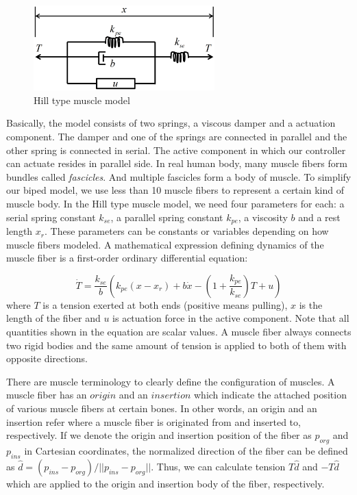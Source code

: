 \documentclass[master,english,final]{kaist-ucs}
\begin{document}
\begin{figure}[h!]
  \centering
  \includegraphics[width=2.75in]{musclemodel}
  \caption{Hill type muscle model}
\end{figure}

\noindent Basically, the model consists of two springs, a viscous damper and a actuation component.
The damper and one of the springs are connected in parallel and the other spring is
connected in serial. The active component in which our controller
can actuate resides in parallel side.
In real human body, many muscle fibers form bundles called \emph{fascicles}.
And multiple fascicles form a body of muscle.
To simplify our biped model, we use less than 10 muscle fibers to represent a certain kind of muscle body.
In the Hill type muscle model, we need four parameters for each:
a serial spring constant $k_{se}$, a parallel spring constant $k_{pe}$, a viscosity $b$ and a rest length $x_{r}$.
These parameters can be constants or variables depending on how muscle fibers modeled.
A mathematical expression defining dynamics of the muscle fiber is a first-order ordinary differential equation:

\begin{equation}\label{Tension}
\dot{T} = \frac{k_{se}}{b} \left( k_{pe}(x-x_{r})+b\dot{x}-\left(1+\frac{k_{pe}}{k_{se}}\right)T+u   \right)
\end{equation}
where $T$ is a tension exerted at both ends (positive means pulling), $x$ is the length of the fiber and $u$ is actuation force in the active component.
Note that all quantities shown in the equation are scalar values.
A muscle fiber always connects two rigid bodies and the same amount of
tension is applied to both of them with opposite directions.


There are muscle terminology to clearly define the configuration of muscles.
A muscle fiber has an $origin$ and an $insertion$ which indicate the attached position
of various muscle fibers at certain bones.
In other words, an origin and an insertion refer where a muscle fiber is originated from and inserted to, respectively.
If we denote the origin and insertion position of the fiber as $p_{org}$ and $p_{ins}$ in Cartesian coordinates,
the normalized direction of the fiber can be defined as $\hat{d}=(p_{ins}-p_{org})/||p_{ins}-p_{org}||$.
Thus, we can calculate tension $T\hat{d}$ and $-T\hat{d}$ which are applied to the origin and insertion body of the fiber, respectively.
\end{document}
